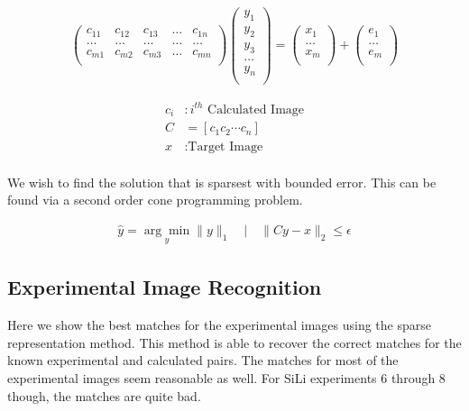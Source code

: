 \documentclass[12pt,letterpaper]{article}
\begin{document}
\begin{align*}
\left(\begin{array}{ccccc}
c_{11} & c_{12} & c_{13} & \ldots & c_{1n} \\
\ldots & \ldots & \ldots & \ldots & \ldots \\
c_{m1} & c_{m2} & c_{m3} & \ldots & c_{mn} \\
\end{array}\right)
\left(\begin{array}{c}
y_1\\
y_2\\
y_3\\
\ldots\\
y_n\\
\end{array}
\right)
= \left(\begin{array}{c}
x_1\\
\ldots\\
x_m\\
\end{array}
\right)
+
\left(\begin{array}{c}
e_1\\
\ldots\\
e_m\\
\end{array}
\right)
\end{align*}

\begin{align*}
c_i&: i^{th} \mbox{ Calculated Image} \\
C &= [c_1 c_2 \cdots c_n] \\
x&: \mbox{Target Image}\\
\end{align*}

We wish to find the solution that is sparsest with bounded error. This can be
found via a second order cone programming problem.

\begin{align*}
\hat{y} = \underset{y}{\arg\min} \| y \|_1 \hspace{1em}|\hspace{1em} \|Cy - x\|_2 \leq \epsilon
\end{align*}

\subsection{Experimental Image Recognition}
Here we show the best matches for the experimental images using the sparse
representation method. This method is able to recover the correct matches for
the known experimental and calculated pairs. The matches for most of the
experimental images seem reasonable as well. For SiLi experiments 6 through 8
though, the matches are quite bad.
\end{document}
